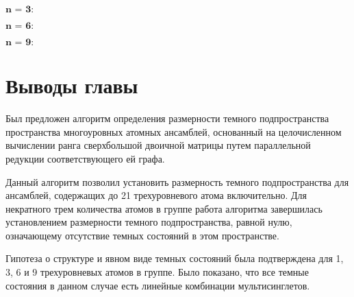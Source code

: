 \clearpage
\noindent $\textbf{n = 3:}$
\begin{figure}[h]
	\label{figCurves}
\end{figure}

\noindent $\textbf{n = 6:}$
\begin{figure}[h]
	\label{figCurves}
\end{figure}

\clearpage
\noindent $\textbf{n = 9:}$
\begin{figure}[h]
	\label{figCurves}
\end{figure}

\begin{figure}[h]
	\label{figCurves}
\end{figure}

\clearpage
\section{Выводы главы}\label{sec:ch4/sect4}
Был предложен алгоритм определения размерности темного подпростран­ства пространства многоуровных атомных ансамблей, основанный на целочисленном вычислении ранга сверхбольшой двоичной матрицы путем параллельной редукции соответствующего ей графа.

Данный алгоритм позволил установить размерность темного подпростран­ства для ансамблей, содержащих до 21 трехуровневого атома включительно. Для некратного трем количества атомов в группе работа алгоритма завер­шилась установлением размерности темного подпространства, равной нулю, означающему отсутствие темных состояний в этом пространстве.

Гипотеза о структуре и явном виде темных состояний была подтверждена для 1, 3, 6 и 9 трехуровневых атомов в группе. Было показано, что все темные состояния в данном случае есть линейные комбинации мультисинглетов.